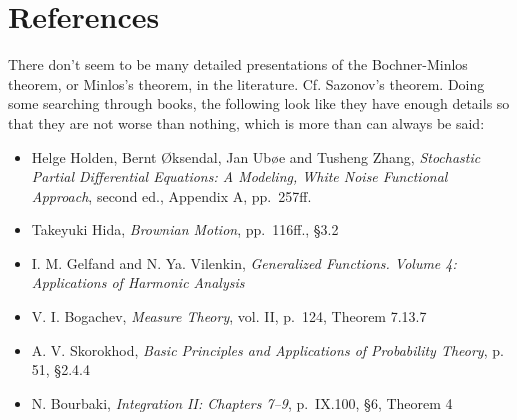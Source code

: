 \documentclass{article}
\theoremstyle{definition}
\theoremstyle{definition}
\begin{document}
\section{References}
There don't seem to be many detailed presentations of the Bochner-Minlos theorem, or Minlos's theorem, in the literature. Cf. Sazonov's theorem.
Doing some searching through books, the following look like they have enough details so that they are not  worse than nothing, which is more than can always be said:
\begin{itemize}
\item Helge Holden, Bernt {\O}ksendal, Jan Ub{\o}e and Tusheng Zhang, {\em Stochastic Partial Differential Equations: A Modeling, White Noise
Functional Approach}, second ed., Appendix A, pp.~257ff.
\item Takeyuki Hida, {\em Brownian Motion}, pp.~116ff., \S 3.2
\item I. M. Gelfand and N. Ya. Vilenkin, {\em Generalized Functions. Volume 4: Applications of Harmonic Analysis}
\item V. I. Bogachev, {\em Measure Theory}, vol. II, p.~124, Theorem 7.13.7
\item A. V. Skorokhod, {\em Basic Principles and Applications of Probability Theory}, p. 51, \S 2.4.4
\item N. Bourbaki, {\em Integration II: Chapters 7--9}, p.~IX.100, \S 6, Theorem 4
\end{itemize}
 
\end{document}
